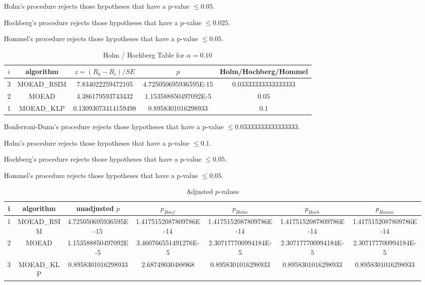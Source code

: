 \documentclass[a4paper,10pt]{article}
\begin{document}
\begin{landscape}
Holm's procedure rejects those hypotheses that have a p-value $\le0.05$.


Hochberg's procedure rejects those hypotheses that have a p-value $\le0.025$.


Hommel's procedure rejects those hypotheses that have a p-value $\le0.05$.


\begin{table}[!htp]
\centering\tiny
\caption{Holm / Hochberg Table for $\alpha=0.10$}
\begin{tabular}{ccccc}
$i$&algorithm&$z=(R_0 - R_i)/SE$&$p$&Holm/Hochberg/Hommel\\
\hline
3&MOEAD_RSIM&7.834022259472105&4.725050695936595E-15&0.03333333333333333\\
2&MOEAD&4.386179593743432&1.153588850497092E-5&0.05\\
1&MOEAD_KLP&0.13093073414159498&0.8958301016298933&0.1\\
\hline
\end{tabular}
\end{table}
Bonferroni-Dunn's procedure rejects those hypotheses that have a p-value $\le0.03333333333333333$.


Holm's procedure rejects those hypotheses that have a p-value $\le0.1$.


Hochberg's procedure rejects those hypotheses that have a p-value $\le0.05$.


Hommel's procedure rejects those hypotheses that have a p-value $\le0.05$.


\begin{table}[!htp]
\centering\tiny
\caption{Adjusted $p$-values}
\begin{tabular}{ccccccc}
i&algorithm&unadjusted $p$&$p_{Bonf}$&$p_{Holm}$&$p_{Hoch}$&$p_{Homm}$\\
\hline
1&MOEAD_RSIM&4.725050695936595E-15&1.4175152087809786E-14&1.4175152087809786E-14&1.4175152087809786E-14&1.4175152087809786E-14\\
2&MOEAD&1.153588850497092E-5&3.460766551491276E-5&2.307177700994184E-5&2.307177700994184E-5&2.307177700994184E-5\\
3&MOEAD_KLP&0.8958301016298933&2.68749030488968&0.8958301016298933&0.8958301016298933&0.8958301016298933\\
\hline
\end{tabular}
\end{table}


\end{landscape}
\end{document}
